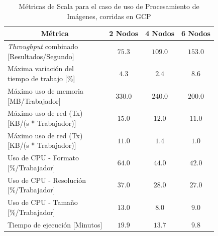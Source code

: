 \documentclass[11pt]{article}
\providecommand{\row}[1]{\parbox{150pt}{\setlength{\baselineskip}{0.2\baselineskip}\strut#1\strut}}
\newcommand{\ipcap}[2]{\caption{Métricas de #1 para el caso de uso de Procesamiento de Imágenes, corridas en #2}}
\newcommand{\english}[1]{\textit{#1}}
\begin{document}
\begin{table}[H]
\centering
\begin{tabular}{|l|c|c|c|}
\hline
\multicolumn{1}{|c|}{Métrica} & 2 Nodos & 4 Nodos & 6 Nodos \\ \hline
\row{\english{Throughput} combinado\\{[Resultados/Segundo]}} & $75.3$ & $109.0$ & $153.0$ \\ \hline
\row{Máxima variación del \\ tiempo de trabajo {[}\%{]}} & $4.3$ & $2.4$ & $8.6$ \\ \hline
\row{Máximo uso de memoria \\ {[MB/Trabajador]}} & $330.0$ & $240.0$ & $200.0$ \\ \hline
\row{Máximo uso de red (Tx) \\ {[KB/(s * Trabajador)]}} & $15.0$ & $12.0$ & $11.0$ \\ \hline
\row{Máximo uso de red (Tx) \\ {[KB/(s * Trabajador)]}} & $11.0$ & $1.4$ & $1.0$ \\ \hline
\row{Uso de CPU - Formato\\{[\%/Trabajador]}} & $64.0$ & $44.0$ & $42.0$ \\ \hline
\row{Uso de CPU - Resolución\\{[\%/Trabajador]}} & $37.0$ & $28.0$ & $27.0$ \\ \hline
\row{Uso de CPU - Tamaño\\{[\%/Trabajador]}} & $13.0$ & $8.0$ & $9.0$ \\ \hline
Tiempo de ejecución [Minutos] & $19.9$ & $13.7$ & $9.8$ \\ \hline
\end{tabular}
\ipcap{Scala}{GCP}
\end{table}
\end{document}
